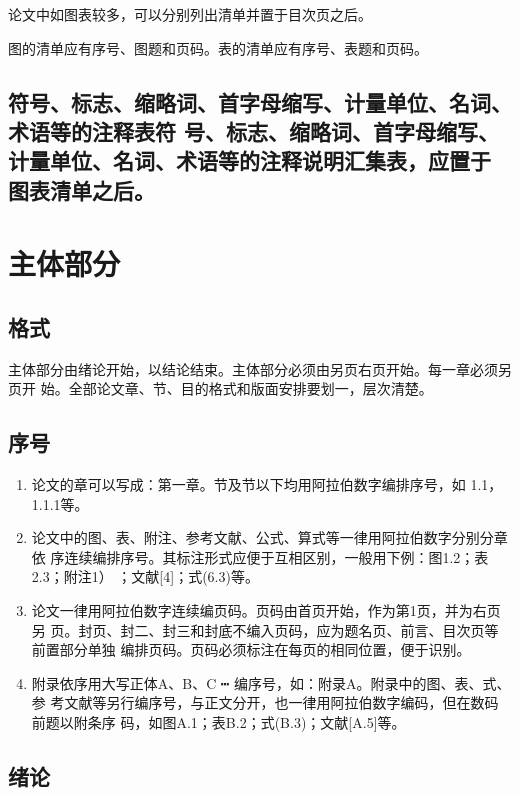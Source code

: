 \documentclass[oneside, phd]{njuthesis}
\begin{document}
论文中如图表较多，可以分别列出清单并置于目次页之后。


图的清单应有序号、图题和页码。表的清单应有序号、表题和页码。

\subsection{符号、标志、缩略词、首字母缩写、计量单位、名词、术语等的注释表符
号、标志、缩略词、首字母缩写、计量单位、名词、术语等的注释说明汇集表，应置于
图表清单之后。}

\section{主体部分}

\subsection{格式}

主体部分由绪论开始，以结论结束。主体部分必须由另页右页开始。每一章必须另页开
始。全部论文章、节、目的格式和版面安排要划一，层次清楚。

\subsection{序号}

\begin{enumerate}

\item 论文的章可以写成：第一章。节及节以下均用阿拉伯数字编排序号，如
1.1，1.1.1等。

\item 论文中的图、表、附注、参考文献、公式、算式等一律用阿拉伯数字分别分章依
序连续编排序号。其标注形式应便于互相区别，一般用下例：图1.2；表2.3；附注1）
；文献[4]；式(6.3)等。

\item 论文一律用阿拉伯数字连续编页码。页码由首页开始，作为第1页，并为右页另
页。封页、封二、封三和封底不编入页码，应为题名页、前言、目次页等前置部分单独
编排页码。页码必须标注在每页的相同位置，便于识别。

\item 附录依序用大写正体A、B、C ┅ 编序号，如：附录A。附录中的图、表、式、参
考文献等另行编序号，与正文分开，也一律用阿拉伯数字编码，但在数码前题以附条序
码，如图A.1；表B.2；式(B.3)；文献[A.5]等。

\end{enumerate}

\subsection{绪论}
\end{document}
